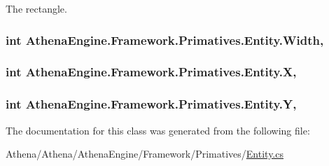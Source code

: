 The rectangle. \hypertarget{class_athena_engine_1_1_framework_1_1_primatives_1_1_entity_aa5e4a2cef8f6796349b80bb7dfcc4995}{
\subsubsection[{Width}]{\setlength{\rightskip}{0pt plus 5cm}int Athena\-Engine.\-Framework.\-Primatives.\-Entity.\-Width\hspace{0.3cm}{\ttfamily [get]}, {\ttfamily [set]}}}\label{class_athena_engine_1_1_framework_1_1_primatives_1_1_entity_aa5e4a2cef8f6796349b80bb7dfcc4995}
\hypertarget{class_athena_engine_1_1_framework_1_1_primatives_1_1_entity_a8cad715272e9bed7c5d103ccdb439fc4}{
\subsubsection[{X}]{\setlength{\rightskip}{0pt plus 5cm}int Athena\-Engine.\-Framework.\-Primatives.\-Entity.\-X\hspace{0.3cm}{\ttfamily [get]}, {\ttfamily [set]}}}\label{class_athena_engine_1_1_framework_1_1_primatives_1_1_entity_a8cad715272e9bed7c5d103ccdb439fc4}
\hypertarget{class_athena_engine_1_1_framework_1_1_primatives_1_1_entity_add42f9406176b93a9996ebc2dd267f02}{
\subsubsection[{Y}]{\setlength{\rightskip}{0pt plus 5cm}int Athena\-Engine.\-Framework.\-Primatives.\-Entity.\-Y\hspace{0.3cm}{\ttfamily [get]}, {\ttfamily [set]}}}\label{class_athena_engine_1_1_framework_1_1_primatives_1_1_entity_add42f9406176b93a9996ebc2dd267f02}


The documentation for this class was generated from the following file\-:\begin{DoxyCompactItemize}
\item 
Athena/\-Athena/\-Athena\-Engine/\-Framework/\-Primatives/\hyperlink{_entity_8cs}{Entity.\-cs}\end{DoxyCompactItemize}
